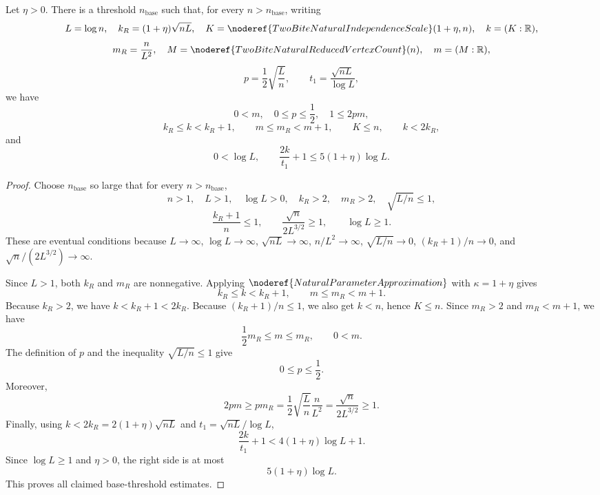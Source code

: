 \begin{lemma}
Let \(\eta>0\).  There is a threshold \(n_{\mathrm{base}}\) such that, for
every \(n>n_{\mathrm{base}}\), writing
\[
L=\log n,\quad
k_R=(1+\eta)\sqrt{nL},\quad
K=\noderef{TwoBiteNaturalIndependenceScale}(1+\eta,n),\quad k=(K:\mathbb R),
\]
\[
m_R=\frac{n}{L^2},\quad
M=\noderef{TwoBiteNaturalReducedVertexCount}(n),\quad m=(M:\mathbb R),
\]
\[
p=\frac12\sqrt{\frac Ln},\qquad
t_1=\frac{\sqrt{nL}}{\log L},
\]
we have
\[
0<m,\quad 0\le p\le\frac12,\quad 1\le2pm,
\]
\[
k_R\le k<k_R+1,\qquad m\le m_R<m+1,\qquad K\le n,\qquad k<2k_R,
\]
and
\[
0<\log L,\qquad
\frac{2k}{t_1}+1\le5(1+\eta)\log L.
\]
\end{lemma}
\begin{proof}
Choose \(n_{\mathrm{base}}\) so large that for every \(n>n_{\mathrm{base}}\),
\[
n>1,\quad L>1,\quad \log L>0,\quad k_R>2,\quad m_R>2,
\quad \sqrt{L/n}\le1,
\]
\[
\frac{k_R+1}{n}\le1,\qquad
\frac{\sqrt n}{2L^{3/2}}\ge1,\qquad \log L\ge1.
\]
These are eventual conditions because \(L\to\infty\), \(\log L\to\infty\),
\(\sqrt{nL}\to\infty\), \(n/L^2\to\infty\), \(\sqrt{L/n}\to0\),
\((k_R+1)/n\to0\), and \(\sqrt n/(2L^{3/2})\to\infty\).

Since \(L>1\), both \(k_R\) and \(m_R\) are nonnegative.  Applying
\(\noderef{NaturalParameterApproximation}\) with \(\kappa=1+\eta\) gives
\[
k_R\le k<k_R+1,\qquad m\le m_R<m+1.
\]
Because \(k_R>2\), we have \(k<k_R+1<2k_R\).  Because
\((k_R+1)/n\le1\), we also get \(k<n\), hence \(K\le n\).  Since
\(m_R>2\) and \(m_R<m+1\), we have
\[
\frac12m_R\le m\le m_R,\qquad 0<m.
\]
The definition of \(p\) and the inequality \(\sqrt{L/n}\le1\) give
\[
0\le p\le\frac12.
\]
Moreover,
\[
2pm\ge p m_R
=\frac12\sqrt{\frac Ln}\frac n{L^2}
=\frac{\sqrt n}{2L^{3/2}}\ge1.
\]
Finally, using \(k<2k_R=2(1+\eta)\sqrt{nL}\) and
\(t_1=\sqrt{nL}/\log L\),
\[
\frac{2k}{t_1}+1
<4(1+\eta)\log L+1.
\]
Since \(\log L\ge1\) and \(\eta>0\), the right side is at most
\[
5(1+\eta)\log L.
\]
This proves all claimed base-threshold estimates.
\end{proof}
